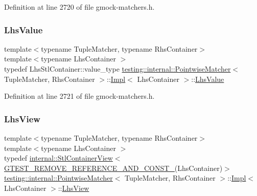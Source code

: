 Definition at line 2720 of file gmock-\/matchers.\+h.

\mbox{\label{classtesting_1_1internal_1_1PointwiseMatcher_1_1Impl_a453769e721f4212e399f76c980b4b65c}} 
\subsubsection{\texorpdfstring{Lhs\+Value}{LhsValue}}
{\footnotesize\ttfamily template$<$typename Tuple\+Matcher, typename Rhs\+Container$>$ \\
template$<$typename Lhs\+Container $>$ \\
typedef Lhs\+Stl\+Container\+::value\+\_\+type \hyperlink{classtesting_1_1internal_1_1PointwiseMatcher}{testing\+::internal\+::\+Pointwise\+Matcher}$<$ Tuple\+Matcher, Rhs\+Container $>$\+::\hyperlink{classtesting_1_1internal_1_1PointwiseMatcher_1_1Impl}{Impl}$<$ Lhs\+Container $>$\+::\hyperlink{classtesting_1_1internal_1_1PointwiseMatcher_1_1Impl_a453769e721f4212e399f76c980b4b65c}{Lhs\+Value}}



Definition at line 2721 of file gmock-\/matchers.\+h.

\mbox{\label{classtesting_1_1internal_1_1PointwiseMatcher_1_1Impl_a5240abc710bb0a5bedfd180bf6701fae}} 
\subsubsection{\texorpdfstring{Lhs\+View}{LhsView}}
{\footnotesize\ttfamily template$<$typename Tuple\+Matcher, typename Rhs\+Container$>$ \\
template$<$typename Lhs\+Container $>$ \\
typedef \hyperlink{classtesting_1_1internal_1_1StlContainerView}{internal\+::\+Stl\+Container\+View}$<$ \hyperlink{gtest-internal_8h_a874567b176266188fabfffb8393267ce}{G\+T\+E\+S\+T\+\_\+\+R\+E\+M\+O\+V\+E\+\_\+\+R\+E\+F\+E\+R\+E\+N\+C\+E\+\_\+\+A\+N\+D\+\_\+\+C\+O\+N\+S\+T\+\_\+}(Lhs\+Container)$>$ \hyperlink{classtesting_1_1internal_1_1PointwiseMatcher}{testing\+::internal\+::\+Pointwise\+Matcher}$<$ Tuple\+Matcher, Rhs\+Container $>$\+::\hyperlink{classtesting_1_1internal_1_1PointwiseMatcher_1_1Impl}{Impl}$<$ Lhs\+Container $>$\+::\hyperlink{classtesting_1_1internal_1_1PointwiseMatcher_1_1Impl_a5240abc710bb0a5bedfd180bf6701fae}{Lhs\+View}}



